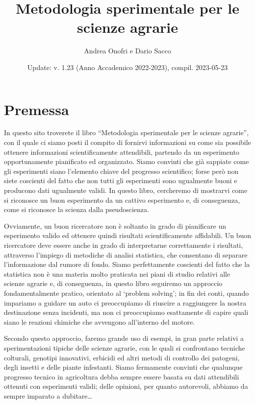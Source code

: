 \documentclass[a4paper,12pt,oneside]{book}
\author{Andrea Onofri e Dario Sacco}
\date{Update: v. 1.23 (Anno Accademico 2022-2023), compil. 2023-05-23}
\title{Metodologia sperimentale per le scienze agrarie}
\subtitle{}
\begin{document}
\maketitle
\tableofcontents

\hypertarget{premessa}{%
\chapter*{Premessa}\label{premessa}}

In questo sito troverete il libro ``Metodologia sperimentale per le scienze agrarie'', con il quale ci siamo posti il compito di fornirvi informazioni su come sia possibile ottenere informazioni scientificamente attendibili, partendo da un esperimento opportunamente pianificato ed organizzato. Siamo convinti che già sappiate come gli esperimenti siano l'elemento chiave del progresso scientifico; forse però non siete coscienti del fatto che non tutti gli esperimenti sono ugualmente buoni e producono dati ugualmente validi. In questo libro, cercheremo di mostrarvi come si riconosce un buon esperimento da un cattivo esperimento e, di conseguenza, come si riconosce la scienza dalla pseudoscienza.

Ovviamente, un buon ricercatore non è soltanto in grado di pianificare un esperimento valido ed ottenere quindi risultati scientificamente affidabili. Un buon ricercatore deve essere anche in grado di interpretarne correttamente i risultati, attraverso l'impiego di metodiche di analisi statistica, che consentano di separare l'informazione dal rumore di fondo. Siamo perfettamente coscienti del fatto che la statistica non è una materia molto praticata nei piani di studio relativi alle scienze agrarie e, di conseguenza, in questo libro seguiremo un approccio fondamentalmente pratico, orientato al `problem solving'; in fin dei conti, quando impariamo a guidare un auto ci preoccupiamo di riuscire a raggiungere la nostra destinazione senza incidenti, ma non ci preoccupiamo esattamente di capire quali siano le reazioni chimiche che avvengono all'interno del motore.

Secondo questo approccio, faremo grande uso di esempi, in gran parte relativi a sperimentazioni tipiche delle scienze agrarie, con le quali si confrontano tecniche colturali, genotipi innovativi, erbicidi ed altri metodi di controllo dei patogeni, degli insetti e delle piante infestanti. Siamo fermamente convinti che qualunque progresso tecnico in agricoltura debba sempre essere basata su dati attendibili ottenuti con esperimenti validi; delle opinioni, per quanto autorevoli, abbiamo da sempre imparato a dubitare\ldots{}
\end{document}
